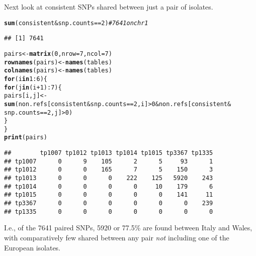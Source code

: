 \documentclass{article}\usepackage[]{graphicx}\usepackage[]{color}
\makeatletter
\newcommand{\hlnum}[1]{\textcolor[rgb]{0.686,0.059,0.569}{#1}}%
\newcommand{\hlcom}[1]{\textcolor[rgb]{0.678,0.584,0.686}{\textit{#1}}}%
\newcommand{\hlopt}[1]{\textcolor[rgb]{0,0,0}{#1}}%
\newcommand{\hlstd}[1]{\textcolor[rgb]{0.345,0.345,0.345}{#1}}%
\newcommand{\hlkwa}[1]{\textcolor[rgb]{0.161,0.373,0.58}{\textbf{#1}}}%
\newcommand{\hlkwb}[1]{\textcolor[rgb]{0.69,0.353,0.396}{#1}}%
\newcommand{\hlkwc}[1]{\textcolor[rgb]{0.333,0.667,0.333}{#1}}%
\newcommand{\hlkwd}[1]{\textcolor[rgb]{0.737,0.353,0.396}{\textbf{#1}}}%
\newenvironment{kframe}{%
 \def\at@end@of@kframe{}%
 \ifinner\ifhmode%
  \def\at@end@of@kframe{\end{minipage}}%
  \begin{minipage}{\columnwidth}%
 \fi\fi%
 \def\FrameCommand##1{\hskip\@totalleftmargin \hskip-\fboxsep
 \colorbox{shadecolor}{##1}\hskip-\fboxsep
     \hskip-\linewidth \hskip-\@totalleftmargin \hskip\columnwidth}%
 \MakeFramed {\advance\hsize-\width
   \@totalleftmargin\z@ \linewidth\hsize
   \@setminipage}}%
 {\par\unskip\endMakeFramed%
 \at@end@of@kframe}
\newenvironment{knitrout}{}{} %
\makeatother
\begin{document}
Next look at consistent SNPs shared between just a pair of isolates.
\begin{knitrout}\small
{}\color{fgcolor}\begin{kframe}
\begin{alltt}
\hlkwd{sum}\hlstd{(consistent} \hlopt{&} \hlstd{snp.counts} \hlopt{==} \hlnum{2}\hlstd{)}  \hlcom{# 7641 on chr1}
\end{alltt}
\begin{verbatim}
## [1] 7641
\end{verbatim}
\begin{alltt}
\hlstd{pairs} \hlkwb{<-} \hlkwd{matrix}\hlstd{(}\hlnum{0}\hlstd{,} \hlkwc{nrow} \hlstd{=} \hlnum{7}\hlstd{,} \hlkwc{ncol} \hlstd{=} \hlnum{7}\hlstd{)}
\hlkwd{rownames}\hlstd{(pairs)} \hlkwb{<-} \hlkwd{names}\hlstd{(tables)}
\hlkwd{colnames}\hlstd{(pairs)} \hlkwb{<-} \hlkwd{names}\hlstd{(tables)}
\hlkwa{for} \hlstd{(i} \hlkwa{in} \hlnum{1}\hlopt{:}\hlnum{6}\hlstd{) \{}
    \hlkwa{for} \hlstd{(j} \hlkwa{in} \hlstd{(i} \hlopt{+} \hlnum{1}\hlstd{)}\hlopt{:}\hlnum{7}\hlstd{) \{}
        \hlstd{pairs[i, j]} \hlkwb{<-} \hlkwd{sum}\hlstd{(non.refs[consistent} \hlopt{&} \hlstd{snp.counts} \hlopt{==} \hlnum{2}\hlstd{, i]} \hlopt{>} \hlnum{0} \hlopt{&} \hlstd{non.refs[consistent} \hlopt{&}
            \hlstd{snp.counts} \hlopt{==} \hlnum{2}\hlstd{, j]} \hlopt{>} \hlnum{0}\hlstd{)}
    \hlstd{\}}
\hlstd{\}}
\hlkwd{print}\hlstd{(pairs)}
\end{alltt}
\begin{verbatim}
##        tp1007 tp1012 tp1013 tp1014 tp1015 tp3367 tp1335
## tp1007      0      9    105      2      5     93      1
## tp1012      0      0    165      7      5    150      3
## tp1013      0      0      0    222    125   5920    243
## tp1014      0      0      0      0     10    179      6
## tp1015      0      0      0      0      0    141     11
## tp3367      0      0      0      0      0      0    239
## tp1335      0      0      0      0      0      0      0
\end{verbatim}
\end{kframe}
\end{knitrout}

I.e., of the 7641 paired SNPs, 5920 or
77.5\%  are found between Italy and Wales, with comparatively
few shared between any pair \emph{not} including one of the European isolates.
\end{document}
